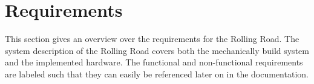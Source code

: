 \chapter{Requirements}
This section gives an overview over the requirements for the Rolling Road. The system description of the Rolling Road covers both the mechanically build system and the implemented hardware. The functional and non-functional requirements are labeled such that they can easily be referenced later on in the documentation.


